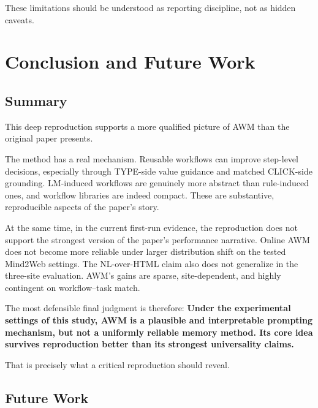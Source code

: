 \documentclass{article}
\begin{document}
These limitations should be understood as reporting discipline, not as
hidden caveats.

\section{Conclusion and Future
Work}\label{conclusion-and-future-work}

\subsection{Summary}\label{summary}

This deep reproduction supports a more qualified picture of AWM than the
original paper presents.

The method has a real mechanism. Reusable workflows can improve
step-level decisions, especially through TYPE-side value guidance and
matched CLICK-side grounding. LM-induced workflows are genuinely more
abstract than rule-induced ones, and workflow libraries are indeed
compact. These are substantive, reproducible aspects of the paper's
story.

At the same time, in the current first-run evidence, the reproduction
does not support the strongest version of the paper's performance
narrative. Online AWM does not become more reliable under larger
distribution shift on the tested Mind2Web settings. The NL-over-HTML
claim also does not generalize in the three-site evaluation. AWM's gains
are sparse, site-dependent, and highly contingent on workflow--task
match.

The most defensible final judgment is therefore:
\textbf{Under the experimental settings of this study, AWM is a
plausible and interpretable prompting mechanism, but not a uniformly
reliable memory method. Its core idea survives reproduction better than
its strongest universality claims.}

That is precisely what a critical reproduction should reveal.

\subsection{Future Work}\label{future-work}
\end{document}
